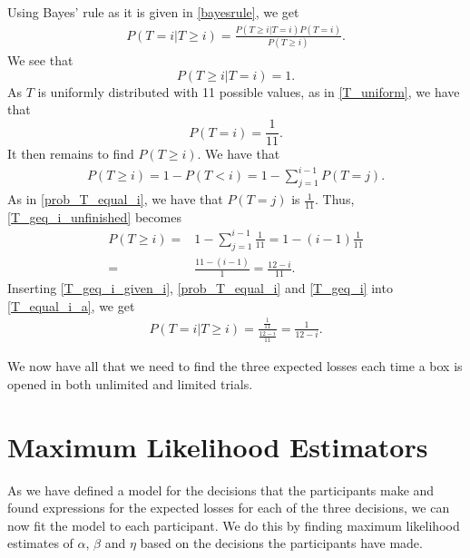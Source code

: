 Using Bayes' rule as it is given in \eqref{bayesrule}, we get
\begin{equation}
\label{T_equal_i_a}
    \begin{aligned}
        P(T=i|T\geq i) = \frac{P(T\geq i|T=i)P(T=i)}{P(T\geq i)}.
    \end{aligned}
\end{equation}
We see that 
\begin{equation}
\label{T_geq_i_given_i}
    P(T\geq i|T=i) = 1.
\end{equation}
As $T$ is uniformly distributed with 11 possible values, as in \eqref{T_uniform}, we have that
\begin{equation}
\label{prob_T_equal_i}
    P(T=i) = \frac{1}{11}.
\end{equation}
It then remains to find $P(T\geq i)$. We have that
\begin{equation}
\label{T_geq_i_unfinished}
    \begin{aligned}
        P(T\geq i) = 1 - P(T<i) = 1 - \sum_{j=1}^{i-1}P(T=j).
    \end{aligned}
\end{equation}
As in \eqref{prob_T_equal_i}, we have that $P(T=j)$ is $\frac{1}{11}$. Thus, \eqref{T_geq_i_unfinished} becomes
\begin{equation}
\label{T_geq_i}
    \begin{aligned}
        P(T\geq i) =& 1-\sum_{j=1}^{i-1} \frac{1}{11} = 1- (i-1)\frac{1}{11}\\[6pt]
        =& \frac{11-(i-1)}{1} = \frac{12-i}{11}.
    \end{aligned}
\end{equation}
Inserting \eqref{T_geq_i_given_i}, \eqref{prob_T_equal_i} and \eqref{T_geq_i} into \eqref{T_equal_i_a}, we get 
\begin{equation}
    \begin{aligned}
        P(T=i|T\geq i) = \frac{\frac{1}{11}}{\frac{12-i}{11}} = \frac{1}{12-i}.
    \end{aligned}
\end{equation}

We now have all that we need to find the three expected losses each time a box is opened in both unlimited and limited trials. 





\section{Maximum Likelihood Estimators}
\label{section:mles}
As we have defined a model for the decisions that the participants make and found expressions for the expected losses for each of the three decisions, we can now fit the model to each participant. We do this by finding maximum likelihood estimates of $\alpha$, $\beta$ and $\eta$ based on the decisions the participants have made.

